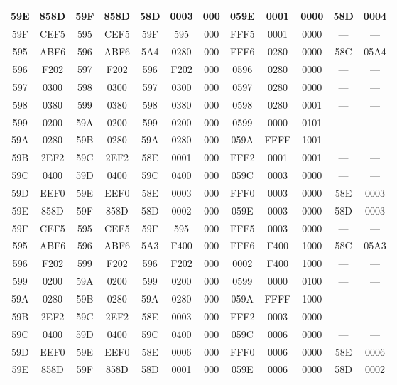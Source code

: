 \begin{center}
\begin{tabular}{|c|c|c|c|c|c|c|c|c|c|c|c|}
\hline
59E & 858D & 59F & 858D & 58D & 0003 & 000 & 059E & 0001 & 0000 & 58D & 0004\\
\hline
59F & CEF5 & 595 & CEF5 & 59F & 595 & 000 & FFF5 & 0001 & 0000 & --- & ---\\
\hline
\hline
595 & ABF6 & 596 & ABF6 & 5A4 & 0280 & 000 & FFF6 & 0280 & 0000 & 58C & 05A4\\
\hline
596 & F202 & 597 & F202 & 596 & F202 & 000 & 0596 & 0280 & 0000 & --- & ---\\
\hline
597 & 0300 & 598 & 0300 & 597 & 0300 & 000 & 0597 & 0280 & 0000 & --- & ---\\
\hline
598 & 0380 & 599 & 0380 & 598 & 0380 & 000 & 0598 & 0280 & 0001 & --- & ---\\
\hline
599 & 0200 & 59A & 0200 & 599 & 0200 & 000 & 0599 & 0000 & 0101 & --- & ---\\
\hline
59A & 0280 & 59B & 0280 & 59A & 0280 & 000 & 059A & FFFF & 1001 & --- & ---\\
\hline
59B & 2EF2 & 59C & 2EF2 & 58E & 0001 & 000 & FFF2 & 0001 & 0001 & --- & ---\\
\hline
59C & 0400 & 59D & 0400 & 59C & 0400 & 000 & 059C & 0003 & 0000 & --- & ---\\
\hline
59D & EEF0 & 59E & EEF0 & 58E & 0003 & 000 & FFF0 & 0003 & 0000 & 58E & 0003\\
\hline
59E & 858D & 59F & 858D & 58D & 0002 & 000 & 059E & 0003 & 0000 & 58D & 0003\\
\hline
59F & CEF5 & 595 & CEF5 & 59F & 595 & 000 & FFF5 & 0003 & 0000 & --- & ---\\
\hline
\hline
595 & ABF6 & 596 & ABF6 & 5A3 & F400 & 000 & FFF6 & F400 & 1000 & 58C & 05A3\\
\hline
596 & F202 & 599 & F202 & 596 & F202 & 000 & 0002 & F400 & 1000 & --- & ---\\
\hline
599 & 0200 & 59A & 0200 & 599 & 0200 & 000 & 0599 & 0000 & 0100 & --- & ---\\
\hline
59A & 0280 & 59B & 0280 & 59A & 0280 & 000 & 059A & FFFF & 1000 & --- & ---\\
\hline
59B & 2EF2 & 59C & 2EF2 & 58E & 0003  & 000 & FFF2 & 0003 & 0000 & --- & ---\\
\hline
59C & 0400 & 59D & 0400 & 59C & 0400 & 000 & 059C & 0006 & 0000 & --- & ---\\
\hline
59D & EEF0 & 59E & EEF0 & 58E & 0006 & 000 & FFF0 & 0006 & 0000 & 58E & 0006\\
\hline
59E & 858D & 59F & 858D & 58D & 0001 & 000 & 059E & 0006 & 0000 & 58D & 0002\\

\end{tabular}
\end{center}
